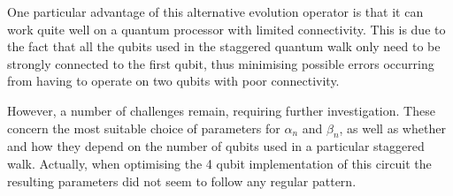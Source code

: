 One particular advantage of this alternative evolution operator is that it can work quite well on a quantum processor with  limited connectivity. This is due to the fact that all the qubits used in the staggered quantum walk only need to be strongly connected to  the first qubit, thus minimising possible errors occurring from having to operate on two qubits with poor connectivity.

However, a number of challenges remain, requiring further investigation. These concern the most suitable choice of parameters for $\alpha_n$ and $\beta_n$, as well as whether and how they depend on the number of qubits used in a particular staggered walk. Actually, when optimising the 4 qubit implementation of this circuit the resulting parameters did not seem to follow any regular pattern. 



%
%
%










